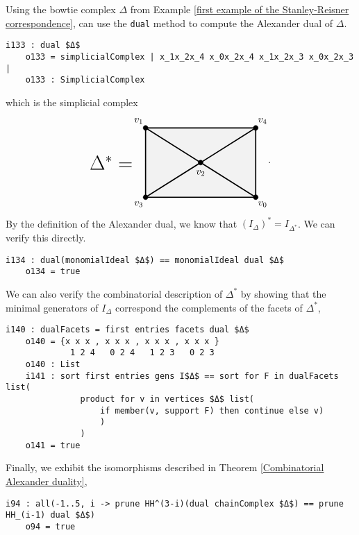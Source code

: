 \documentclass[12pt,leqno]{amsart}
\theoremstyle{definition}
\newenvironment{example}
{\pushQED{\qed}\renewcommand{\qedsymbol}{$\diamond$}\examplex}
{\popQED\endexamplex}
\begin{document}
\begin{example}\label{Alexander Duality}
  Using the bowtie complex $\Delta$ from Example \ref{first example of the Stanley-Reisner correspondence},  can use the \texttt{dual} method to compute the Alexander dual of $\Delta$.
\begin{lstlisting}[basicstyle={\ttfamily \scriptsize}, xleftmargin=-23pt]
    i133 : dual $Δ$
    o133 = simplicialComplex | x_1x_2x_4 x_0x_2x_4 x_1x_2x_3 x_0x_2x_3 |
    o133 : SimplicialComplex
\end{lstlisting}
  which is the simplicial complex
 \begin{displaymath}
    \begin{tikzpicture}[scale = .5]
      \filldraw[gray!10] (0,0) -- (0,5) -- (4,2.5) -- cycle;
      \filldraw[gray!10] (8,0) -- (8,5) -- (4,2.5) -- cycle;
      \filldraw[gray!10] (0,0) -- (8,0) -- (4,2.5) -- cycle;
      \filldraw[gray!10] (0,5) -- (8,5) -- (4,2.5) -- cycle;
      \draw[-,very thick] (0,0) -- (0,5) -- (4,2.5) -- cycle;
      \draw[-,very thick] (8,0) -- (8,5) -- (4,2.5) -- cycle;
      \draw[-,very thick] (0,5) -- (8,5);
      \draw[-,very thick] (0,0) -- (8,0);
      \filldraw (0,0) circle (5pt);
      \filldraw (0,5) circle (5pt);
      \filldraw (4,2.5) circle (5pt);
      \filldraw (8,0) circle (5pt);
      \filldraw (8,5) circle (5pt);
      \node at (-.5,-.5) {$v_3$};
      \node at (-.5,5.5) {$v_1$};
      \node at (4,1.75) {$v_2$};
      \node at (8.5,-.5) {$v_0$};
      \node at (8.5,5.5) {$v_4$};
      \node at (-2.5,2.5) {\huge $\Delta^* = $};
      \node at (9,2.5) {.};
    \end{tikzpicture}
  \end{displaymath}
  By the definition of the Alexander dual, we know that $(I_\Delta)^* = I_{\Delta^*}$. We can verify this directly.
\begin{lstlisting}[basicstyle={\ttfamily \scriptsize}, xleftmargin=-23pt]
    i134 : dual(monomialIdeal $Δ$) == monomialIdeal dual $Δ$
    o134 = true
\end{lstlisting}
  We can also verify the combinatorial description of $\Delta^*$ by showing that the minimal generators of $I_\Delta$ correspond the complements of the facets of $\Delta^*$,
\begin{lstlisting}[basicstyle={\ttfamily \scriptsize}, xleftmargin=-23pt]
    i140 : dualFacets = first entries facets dual $Δ$
    o140 = {x x x , x x x , x x x , x x x }
             1 2 4   0 2 4   1 2 3   0 2 3
    o140 : List
    i141 : sort first entries gens I$Δ$ == sort for F in dualFacets list(
               product for v in vertices $Δ$ list(
                   if member(v, support F) then continue else v)
                   )
               )
    o141 = true
\end{lstlisting}
  Finally, we exhibit the isomorphisms described in Theorem \ref{Combinatorial Alexander duality},
\begin{lstlisting}[basicstyle={\ttfamily \scriptsize}, xleftmargin=-23pt]
    i94 : all(-1..5, i -> prune HH^(3-i)(dual chainComplex $Δ$) == prune HH_(i-1) dual $Δ$)
    o94 = true
\end{lstlisting}
\end{example}
\end{document}
